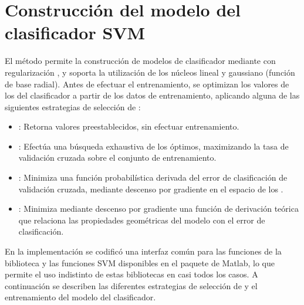 %
%
\section{Construcción del modelo del clasificador SVM}
%
El método permite la construcción de modelos de clasificador mediante
 con regularización , y soporta la utilización de los
núcleos lineal y gaussiano (función de base radial).
Antes de efectuar el entrenamiento, se optimizan los valores de los
 del clasificador a partir de los datos de entrenamiento,
aplicando alguna de las siguientes estrategias de selección de
:
%
\begin{itemize}
\item
  : Retorna valores preestablecidos,
  sin efectuar entrenamiento.
\item
  : Efectúa una búsqueda exhaustiva de los
   óptimos, maximizando la tasa \GM{} de validación cruzada
  sobre el conjunto de entrenamiento.
\item
  : Minimiza una función probabilística
  derivada del error de clasificación de validación cruzada, mediante
  descenso por gradiente en el espacio de los .
\item
  : Minimiza mediante descenso
  por gradiente una función de derivación teórica que relaciona
  las propiedades geométricas del modelo con el error de clasificación.
\end{itemize}
%
En la implementación se codificó una interfaz común para las funciones
de la biblioteca  \cite{libsvm} y las funciones SVM
disponibles en el paquete  de Matlab, lo
que permite el uso indistinto de estas bibliotecas en casi todos los
casos.
A continuación se describen las diferentes estrategias de selección de
 y el entrenamiento del modelo del clasificador.
